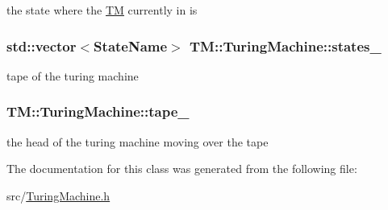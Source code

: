the state where the \hyperlink{namespaceTM}{\-T\-M} currently in is 

\hypertarget{classTM_1_1TuringMachine_aa83fb53ce10f185f3f1859533cc20e0b}{
\subsubsection[{states\-\_\-}]{\setlength{\rightskip}{0pt plus 5cm}std\-::vector$<${\bf \-State\-Name}$>$ {\bf \-T\-M\-::\-Turing\-Machine\-::states\-\_\-}}}\label{dd/d15/classTM_1_1TuringMachine_aa83fb53ce10f185f3f1859533cc20e0b}


tape of the turing machine 

\hypertarget{classTM_1_1TuringMachine_a4c95b19fbea6a3d73b68dea36cd389a0}{
\subsubsection[{tape\-\_\-}]{ {\bf \-T\-M\-::\-Turing\-Machine\-::tape\-\_\-}}}\label{dd/d15/classTM_1_1TuringMachine_a4c95b19fbea6a3d73b68dea36cd389a0}


the head of the turing machine moving over the tape 



\-The documentation for this class was generated from the following file\-:\begin{DoxyCompactItemize}
\item 
src/\hyperlink{TuringMachine_8h}{\-Turing\-Machine.\-h}\end{DoxyCompactItemize}

